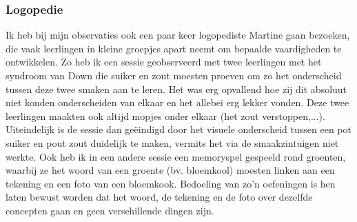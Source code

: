 \documentclass[a4paper,11pt]{article}
\theoremstyle{definition}
\begin{document}
\begin{itemize}
\begin{itemize}
\subsubsection{Logopedie}
Ik heb bij mijn observaties ook een paar keer logopediste Martine gaan bezoeken, 
die vaak leerlingen in kleine groepjes apart neemt om bepaalde vaardigheden te 
ontwikkelen. Zo heb ik een sessie geobserveerd met twee leerlingen met het 
syndroom van Down die suiker en zout moesten proeven om zo het onderscheid 
tussen deze twee smaken aan te leren. Het was erg opvallend hoe zij dit absoluut 
niet konden onderscheiden van elkaar en het allebei erg lekker vonden. Deze twee 
leerlingen maakten ook altijd mopjes onder elkaar (het zout verstoppen,...).
Uiteindelijk is de sessie dan geëindigd door het visuele onderscheid tussen een 
pot suiker en pout zout duidelijk te maken, vermits het via de smaakzintuigen 
niet werkte. Ook heb ik in een andere sessie een memoryspel gespeeld rond 
groenten, waarbij ze het woord van een groente (bv. bloemkool) moesten linken aan een tekening en een foto van 
een bloemkook. Bedoeling van zo'n oefeningen is hen laten bewust worden dat het 
woord, de tekening en de foto over dezelfde concepten gaan en geen verschillende 
dingen zijn.


\end{itemize}
\end{itemize}
\end{document}
